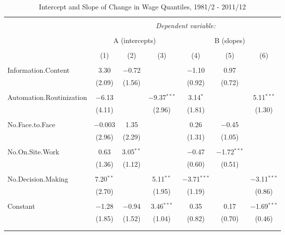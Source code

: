 \documentclass{article}
\begin{document}
\begin{table}[!htbp] \centering 
  \caption{Intercept and Slope of Change in Wage Quantiles, 1981/2 - 2011/12} 
  \label{} 
\begin{tabular}{@{\extracolsep{5pt}}lcccccc} 
\\[-1.8ex]\hline 
\hline \\[-1.8ex] 
 & \multicolumn{6}{c}{\textit{Dependent variable:}} \\ 
\cline{2-7} 
\\[-1.8ex] & \multicolumn{3}{c}{A (intercepts)} & \multicolumn{3}{c}{B (slopes)} \\ 
\\[-1.8ex] & (1) & (2) & (3) & (4) & (5) & (6)\\ 
\hline \\[-1.8ex] 
 Information.Content & 3.30 & $-$0.72 &  & $-$1.10 & 0.97 &  \\ 
  & (2.09) & (1.56) &  & (0.92) & (0.72) &  \\ 
  & & & & & & \\ 
 Automation.Routinization & $-$6.13 &  & $-$9.37$^{***}$ & 3.14$^{*}$ &  & 5.11$^{***}$ \\ 
  & (4.11) &  & (2.96) & (1.81) &  & (1.30) \\ 
  & & & & & & \\ 
 No.Face.to.Face & $-$0.003 & 1.35 &  & 0.26 & $-$0.45 &  \\ 
  & (2.96) & (2.29) &  & (1.31) & (1.05) &  \\ 
  & & & & & & \\ 
 No.On.Site.Work & 0.63 & 3.05$^{**}$ &  & $-$0.47 & $-$1.72$^{***}$ &  \\ 
  & (1.36) & (1.12) &  & (0.60) & (0.51) &  \\ 
  & & & & & & \\ 
 No.Decision.Making & 7.20$^{**}$ &  & 5.11$^{**}$ & $-$3.71$^{***}$ &  & $-$3.11$^{***}$ \\ 
  & (2.70) &  & (1.95) & (1.19) &  & (0.86) \\ 
  & & & & & & \\ 
 Constant & $-$1.28 & $-$0.94 & 3.46$^{***}$ & 0.35 & 0.17 & $-$1.69$^{***}$ \\ 
  & (1.85) & (1.52) & (1.04) & (0.82) & (0.70) & (0.46) \\ 
  & & & & & & \\ 
\hline \\[-1.8ex] 

\end{tabular}
\end{table}
\end{document}
